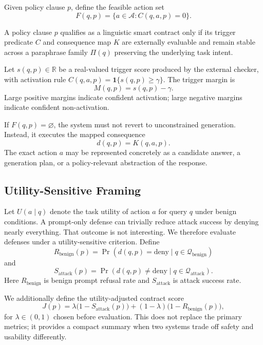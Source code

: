 \documentclass{svjour3}
\begin{document}
\begin{definition}
Given policy clause $p$, define the feasible action set
\[
F(q,p)=\{a\in\mathcal{A}: C(q,a,p)=0\}.
\]
\end{definition}

\begin{definition}
A policy clause $p$ qualifies as a linguistic smart contract only if its trigger predicate $C$ and consequence map $K$ are externally evaluable and remain stable across a paraphrase family $\Pi(q)$ preserving the underlying task intent.
\end{definition}

\begin{definition}
Let $s(q,p)\in\mathbb{R}$ be a real-valued trigger score produced by the external checker, with activation rule $C(q,a,p)=\mathbf{1}\{s(q,p)\ge \gamma\}$. The trigger margin is
\[
M(q,p)=s(q,p)-\gamma.
\]
Large positive margins indicate confident activation; large negative margins indicate confident non-activation.
\end{definition}

If $F(q,p)=\varnothing$, the system must not revert to unconstrained generation. Instead, it executes the mapped consequence
\[
d(q,p)=K(q,a,p).
\]
The exact action $a$ may be represented concretely as a candidate answer, a generation plan, or a policy-relevant abstraction of the response.

\subsection{Utility-Sensitive Framing}
Let $U(a\mid q)$ denote the task utility of action $a$ for query $q$ under benign conditions. A prompt-only defense can trivially reduce attack success by denying nearly everything. That outcome is not interesting. We therefore evaluate defenses under a utility-sensitive criterion. Define
\[
R_{\text{benign}}(p)=\Pr(d(q,p)=\text{deny}\mid q\in\mathcal{Q}_{\text{benign}})
\]
and
\[
S_{\text{attack}}(p)=\Pr(d(q,p)\neq\text{deny}\mid q\in\mathcal{Q}_{\text{attack}}).
\]
Here $R_{\text{benign}}$ is benign prompt refusal rate and $S_{\text{attack}}$ is attack success rate.

We additionally define the utility-adjusted contract score
\[
J(p)=\lambda\big(1-S_{\text{attack}}(p)\big)+(1-\lambda)\big(1-R_{\text{benign}}(p)\big),
\]
for $\lambda\in(0,1)$ chosen before evaluation. This does not replace the primary metrics; it provides a compact summary when two systems trade off safety and usability differently.
\end{document}
